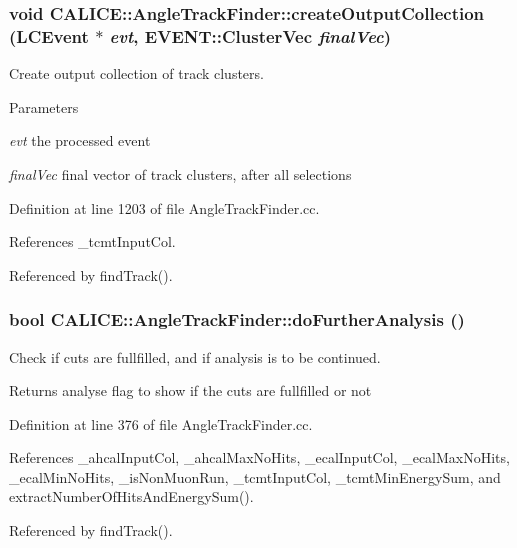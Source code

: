 \subsubsection[{createOutputCollection}]{\setlength{\rightskip}{0pt plus 5cm}void CALICE::AngleTrackFinder::createOutputCollection (LCEvent $\ast$ {\em evt}, \/  EVENT::ClusterVec {\em finalVec})\hspace{0.3cm}{\ttfamily  [private]}}\label{classCALICE_1_1AngleTrackFinder_ae2aa960da701d5e62b15e21c1df40691}


Create output collection of track clusters. 
\begin{DoxyParams}{Parameters}
\item[{\em evt}]the processed event \item[{\em finalVec}]final vector of track clusters, after all selections \end{DoxyParams}


Definition at line 1203 of file AngleTrackFinder.cc.

References \_\-tcmtInputCol.

Referenced by findTrack().
\subsubsection[{doFurtherAnalysis}]{\setlength{\rightskip}{0pt plus 5cm}bool CALICE::AngleTrackFinder::doFurtherAnalysis ()\hspace{0.3cm}{\ttfamily  [private]}}\label{classCALICE_1_1AngleTrackFinder_a118f2d1e9c47337831da14c8c356e555}


Check if cuts are fullfilled, and if analysis is to be continued. \begin{DoxyReturn}{Returns}
analyse flag to show if the cuts are fullfilled or not 
\end{DoxyReturn}


Definition at line 376 of file AngleTrackFinder.cc.

References \_\-ahcalInputCol, \_\-ahcalMaxNoHits, \_\-ecalInputCol, \_\-ecalMaxNoHits, \_\-ecalMinNoHits, \_\-isNonMuonRun, \_\-tcmtInputCol, \_\-tcmtMinEnergySum, and extractNumberOfHitsAndEnergySum().

Referenced by findTrack().
